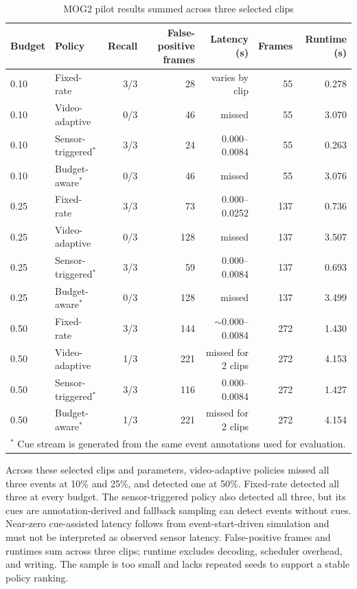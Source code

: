 \documentclass[conference]{IEEEtran}
\begin{document}
\begin{table}[t]
\caption{MOG2 pilot results summed across three selected clips}
\label{tab:mog2}
\centering
\scriptsize
\setlength{\tabcolsep}{4pt}
\begin{tabular}{llrrrrr}
\hline
Budget & Policy & Recall & False-positive frames & Latency (s) & Frames & Runtime (s) \\
\hline
0.10 & Fixed-rate & 3/3 & 28 & varies by clip & 55 & 0.278 \\
0.10 & Video-adaptive & 0/3 & 46 & missed & 55 & 3.070 \\
0.10 & Sensor-triggered$^{*}$ & 3/3 & 24 & 0.000--0.0084 & 55 & 0.263 \\
0.10 & Budget-aware$^{*}$ & 0/3 & 46 & missed & 55 & 3.076 \\
0.25 & Fixed-rate & 3/3 & 73 & 0.000--0.0252 & 137 & 0.736 \\
0.25 & Video-adaptive & 0/3 & 128 & missed & 137 & 3.507 \\
0.25 & Sensor-triggered$^{*}$ & 3/3 & 59 & 0.000--0.0084 & 137 & 0.693 \\
0.25 & Budget-aware$^{*}$ & 0/3 & 128 & missed & 137 & 3.499 \\
0.50 & Fixed-rate & 3/3 & 144 & $\sim$0.000--0.0084 & 272 & 1.430 \\
0.50 & Video-adaptive & 1/3 & 221 & missed for 2 clips & 272 & 4.153 \\
0.50 & Sensor-triggered$^{*}$ & 3/3 & 116 & 0.000--0.0084 & 272 & 1.427 \\
0.50 & Budget-aware$^{*}$ & 1/3 & 221 & missed for 2 clips & 272 & 4.154 \\
\hline
\multicolumn{7}{l}{$^{*}$ Cue stream is generated from the same event annotations used for evaluation.}
\end{tabular}
\end{table}

Across these selected clips and parameters, video-adaptive policies missed all three events at 10\% and 25\%, and detected one at 50\%. Fixed-rate detected all three at every budget. The sensor-triggered policy also detected all three, but its cues are annotation-derived and fallback sampling can detect events without cues. Near-zero cue-assisted latency follows from event-start-driven simulation and must not be interpreted as observed sensor latency. False-positive frames and runtimes sum across three clips; runtime excludes decoding, scheduler overhead, and writing. The sample is too small and lacks repeated seeds to support a stable policy ranking.
\end{document}
